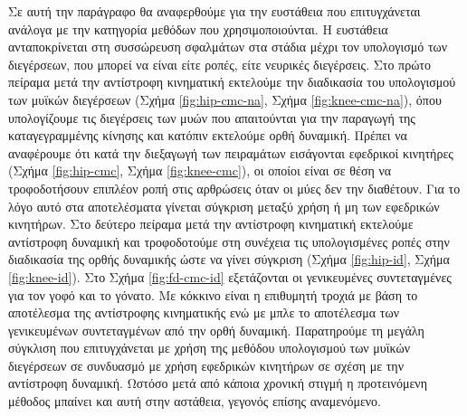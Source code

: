 Σε αυτή την παράγραφο θα αναφερθούμε για την ευστάθεια που επιτυγχάνεται ανάλογα με την κατηγορία μεθόδων που χρησιμοποιούνται. Η ευστάθεια ανταποκρίνεται στη συσσώρευση σφαλμάτων στα στάδια μέχρι τον υπολογισμό των διεγέρσεων, που μπορεί να είναι είτε ροπές, είτε νευρικές διεγέρσεις. Στο πρώτο πείραμα μετά την αντίστροφη κινηματική εκτελούμε την διαδικασία του υπολογισμού των μυϊκών διεγέρσεων (Σχήμα \ref{fig:hip-cmc-na}, Σχήμα \ref{fig:knee-cmc-na}), όπου υπολογίζουμε τις διεγέρσεις των μυών που απαιτούνται για την παραγωγή της καταγεγραμμένης κίνησης και κατόπιν εκτελούμε ορθή δυναμική. Πρέπει να αναφέρουμε ότι κατά την διεξαγωγή των πειραμάτων εισάγονται εφεδρικοί κινητήρες (Σχήμα \ref{fig:hip-cmc}, Σχήμα \ref{fig:knee-cmc}), οι οποίοι είναι σε θέση να τροφοδοτήσουν επιπλέον ροπή στις αρθρώσεις όταν οι μύες δεν την διαθέτουν. Για το λόγο αυτό στα αποτελέσματα γίνεται σύγκριση μεταξύ χρήση ή μη των εφεδρικών κινητήρων. Στο δεύτερο πείραμα μετά την αντίστροφη κινηματική εκτελούμε αντίστροφη δυναμική και τροφοδοτούμε στη συνέχεια τις υπολογισμένες ροπές στην διαδικασία της ορθής δυναμικής ώστε να γίνει σύγκριση (Σχήμα \ref{fig:hip-id}, Σχήμα \ref{fig:knee-id}). Στο Σχήμα \ref{fig:fd-cmc-id} εξετάζονται οι γενικευμένες συντεταγμένες για τον γοφό και το γόνατο. Με κόκκινο είναι η επιθυμητή τροχιά με βάση το αποτέλεσμα της αντίστροφης κινηματικής ενώ με μπλε το αποτέλεσμα των γενικευμένων συντεταγμένων από την ορθή δυναμική. Παρατηρούμε τη μεγάλη σύγκλιση που επιτυγχάνεται με χρήση της μεθόδου υπολογισμού των μυϊκών διεγέρσεων σε συνδυασμό με χρήση εφεδρικών κινητήρων σε σχέση με την αντίστροφη δυναμική. Ωστόσο μετά από κάποια χρονική στιγμή η προτεινόμενη μέθοδος μπαίνει και αυτή στην αστάθεια, γεγονός επίσης αναμενόμενο.


